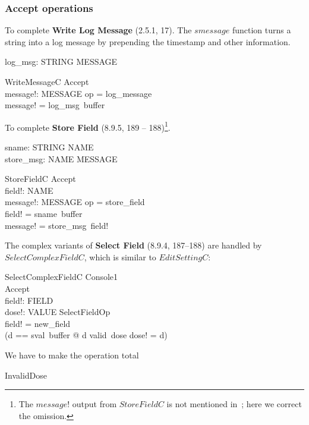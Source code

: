 \documentclass{article}
\begin{document}
\subsubsection{Accept operations}

To complete {\bf Write Log Message} (2.5.1, 17).  The $smessage$
function turns a string into a log message by prepending the timestamp
and other information.

\begin{axdef} log\_msg: STRING \fun MESSAGE \end{axdef}

\begin{schema}{WriteMessageC}
	Accept \\
	message!: MESSAGE
\where
	op = log\_message \\
	message! = log\_msg~buffer
\end{schema}

To complete {\bf Store Field} (8.9.5, 189 -- 188)\footnote{The
$message!$ output from $StoreFieldC$ is not mentioned
in~\cite{jacky92}; here we correct the omission.}.

\begin{axdef}
	sname: STRING \fun NAME \\
	store\_msg: NAME \fun MESSAGE
\end{axdef}
\begin{schema}{StoreFieldC}
	Accept \\
	field!: NAME \\
	message!: MESSAGE
\where
	op = store\_field \\
	field! = sname~buffer \\
	message! = store\_msg~field!
\end{schema}
The complex variants of {\bf Select Field} (8.9.4, 187--188) are
handled by $SelectComplexFieldC$, which is similar to $EditSettingC$:

\begin{schema}{SelectComplexFieldC}
	\Delta Console1 \\
	Accept \\
	field!: FIELD \\
	dose!: VALUE
\where
	SelectFieldOp \\
	field! = new\_field \\
	(\LET d == sval~buffer @ d \in valid~dose \land dose! = d)
\end{schema}
We have to make the operation total

\begin{zed}
InvalidDose 
\end{zed}
\end{document}
